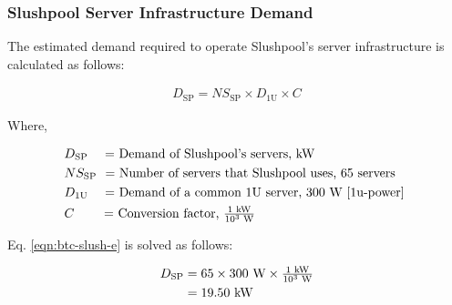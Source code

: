 \subsubsection{Slushpool Server Infrastructure Demand}\label{sec:btc-slushpool-server}

\begin{table}
  \begingroup
  \tiny
  \setlength{\tabcolsep}{10pt}
  \renewcommand{\arraystretch}{1.0}
  \endgroup
  \caption{Slushpool Server Infrastructure as Reported by Slushpool}
  \label{table:slushpool-infra}
\end{table}

The estimated demand required to operate Slushpool's server infrastructure is calculated as follows:

\begin{align}\label{eqn:btc-slush-e}
D_\textrm{SP} = NS_\textrm{SP} \times D_\textrm{1U} \times C
\end{align}

\noindent
Where,

\begin{align*}
&D_\textrm{SP}    \textrm{ \quad = Demand of Slushpool's servers, kW} \\
&NS_\textrm{SP} \textrm{ \ = Number of servers that Slushpool uses, 65 servers} \\
&D_\textrm{1U}  \textrm{\ \quad = Demand of a common 1U server, 300 W \cite{1u-power} } \\
&C              \textrm{\quad \quad \ = Conversion factor, $\tfrac{1 \textrm{ kW} } { 10^3 \textrm{ W}}$}
\end{align*}

Eq. \eqref{eqn:btc-slush-e} is solved as follows:

\begin{align}\label{eqn:btc-slush-e-res}
D_\textrm{SP} &= 65 \times 300 \textrm{ W} \times \tfrac{1 \textrm{ kW} } { 10^3 \textrm{ W}} \nonumber \\
              &= 19.50 \textrm{ kW}
\end{align}

